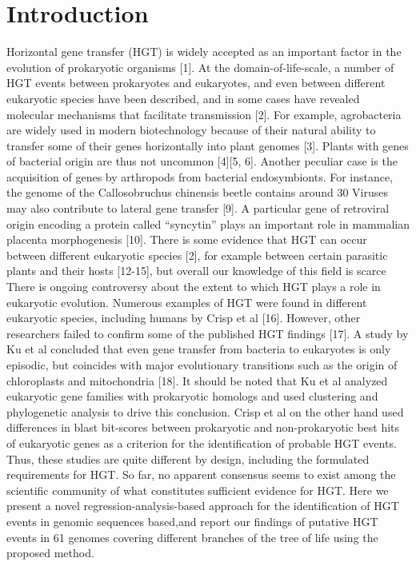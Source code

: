 \section{Introduction}
Horizontal gene transfer (HGT) is widely accepted as an important factor in the evolution of prokaryotic organisms [1]. At the domain-of-life-scale, a number of HGT events between prokaryotes and eukaryotes, and even between different eukaryotic species have been described, and in some cases have revealed molecular mechanisms that facilitate transmission [2]. For example, agrobacteria are widely used in modern biotechnology because of their natural ability to transfer some of their genes horizontally into plant genomes [3]. Plants with genes of bacterial origin are thus not uncommon [4][5, 6].
Another peculiar case is the acquisition of genes by arthropods from bacterial endosymbionts. For instance, the genome of the Callosobruchus chinensis beetle contains around 30%
Viruses may also contribute to lateral gene transfer [9]. A particular gene of retroviral origin encoding a protein called “syncytin” plays an important role in mammalian placenta morphogenesis [10].
There is some evidence that HGT can occur between different eukaryotic species [2], for example between certain parasitic plants and their hosts [12-15], but overall our knowledge of this field is scarce
There is ongoing controversy about the extent to which HGT plays a role in eukaryotic evolution. Numerous examples of HGT were found in different eukaryotic species, including humans by Crisp et al [16]. However, other researchers failed to confirm some of the published HGT findings [17]. A study by Ku et al concluded that even gene transfer from bacteria to eukaryotes is only episodic, but coincides with major evolutionary transitions such as the origin of chloroplasts and mitochondria [18]. It should be noted that Ku et al analyzed eukaryotic gene families with prokaryotic homologs and used clustering and phylogenetic analysis to drive this conclusion. Crisp et al on the other hand used differences in blast bit-scores between prokaryotic and non-prokaryotic best hits of eukaryotic genes as a criterion for the identification of probable HGT events. Thus, these studies are quite different by design, including the formulated requirements for HGT. So far, no apparent consensus seems to exist among the scientific community  of what constitutes sufficient evidence for HGT.
Here we present a novel regression-analysis-based approach for the identification of HGT events in genomic sequences based,and report our findings of putative HGT events in 61 genomes covering different branches of the tree of life using the proposed method.
